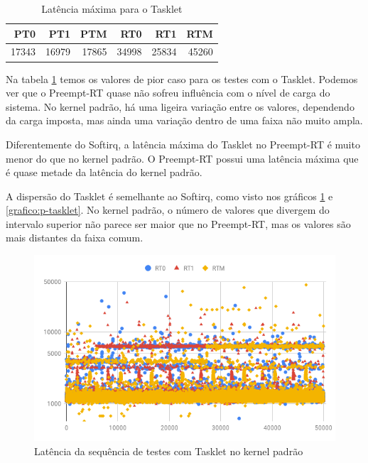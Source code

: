 \begin{table}[!htb]
    \centering
    \begin{center}
        \begin{tabular}{|r|r|r|r|r|r|}
            \toprule
                PT0 &    PT1 &    PTM &    RT0 &     RT1 &    RTM \\
            \midrule
                17343 &  16979 &  17865 & 34998 &  25834 &  45260  \\
            \bottomrule
        \end{tabular}
    \end{center}
    \caption{Latência máxima para o Tasklet}
    \label{table:max-tasklet}
\end{table}

Na tabela \ref{table:max-tasklet} temos os valores de pior caso para os testes com o Tasklet. Podemos ver que o Preempt-RT quase não sofreu influência com o nível de carga do sistema. No kernel padrão, há uma ligeira variação entre os valores, dependendo da carga imposta, mas ainda uma variação dentro de uma faixa não muito ampla.

Diferentemente do Softirq, a latência máxima do Tasklet no Preempt-RT é muito menor do que no kernel padrão. O Preempt-RT possui uma latência máxima que é quase metade da latência do kernel padrão.

A dispersão do Tasklet é semelhante ao Softirq, como visto nos gráficos \ref{grafico:r-tasklet} e \ref{grafico:p-tasklet}. No kernel padrão, o número de valores que divergem do intervalo superior não parece ser maior que no Preempt-RT, mas os valores são mais distantes da faixa comum.

\begin{figure}[!htb]
    \centering
    \includegraphics[width=\textwidth]{graficos/rt-scatter.png}
    \caption{Latência da sequência de testes com Tasklet no kernel padrão}
    \label{grafico:r-tasklet}
\end{figure}

